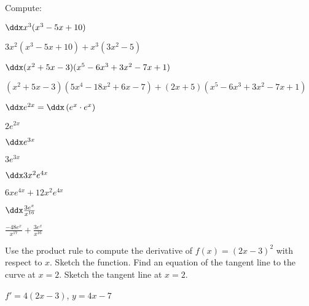 \begin{exercises}

\noindent Compute:

\twocol

\begin{exercise} $\ddx x^3(x^3-5x+10)$
\begin{answer} $3x^2(x^3-5x+10)+x^3(3x^2-5)$
\end{answer}\end{exercise}

\begin{exercise} $\ddx (x^2+5x-3)(x^5-6x^3+3x^2-7x+1)$
\begin{answer} $(x^2+5x-3)(5x^4-18x^2+6x-7)+(2x+5)(x^5-6x^3+3x^2-7x+1)$
\end{answer}\end{exercise}

\begin{exercise} $\ddx e^{2x} = \ddx \left(e^x \cdot e^x\right)$
\begin{answer}
$2e^{2x}$
\end{answer}
\end{exercise}

\begin{exercise} $\ddx e^{3x}$
\begin{answer} $3e^{3x}$
\end{answer}\end{exercise}


\begin{exercise} $\ddx 3x^2e^{4x}$
\begin{answer} $6xe^{4x}+12x^2e^{4x}$
\end{answer}\end{exercise}


\begin{exercise} $\ddx \frac{3e^x}{x^{16}}$
\begin{answer} $\frac{-48e^x}{x^{17}}+\frac{3e^x}{x^{16}}$
\end{answer}\end{exercise}


\endtwocol


\begin{exercise} 
Use the product rule to compute the derivative of $f(x)=(2x-3)^2$ with
respect to $x$.  Sketch the function.  Find an equation of the tangent
line to the curve at $x=2$.  Sketch the tangent line at $x=2$.
\begin{answer} $f'=4(2x-3)$, $y=4x-7$
\end{answer}\end{exercise}


\end{exercises}
